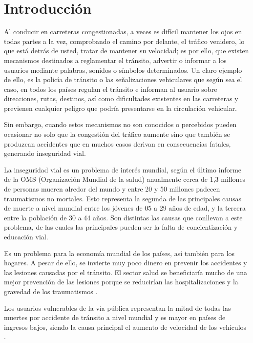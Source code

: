 \chapter{Introducción}
	\setcounter{page}{1}
	\renewcommand{\baselinestretch}{1} %
	Al conducir en carreteras congestionadas, a veces es difícil mantener los ojos en todas partes a la vez, comprobando el camino por delante, el tráfico venidero, lo que está detrás de usted, tratar de mantener su velocidad; es por ello, que existen mecanismos destinados a reglamentar el tránsito, advertir o informar a los usuarios mediante palabras, sonidos o símbolos determinados. Un claro ejemplo de ello, es la policía de tránsito o las señalizaciones vehiculares que según sea el caso, en todos los países regulan el tránsito e informan al usuario sobre direcciones, rutas, destinos, así como dificultades existentes en las carreteras y previenen cualquier peligro que podría presentarse en la circulación vehicular.

	\vskip 0.15cm
	Sin embargo, cuando estos mecanismos no son conocidos o percebidos pueden ocasionar no solo que la congestión del tráfico aumente sino que también se produzcan accidentes que en muchos casos derivan en consecuencias fatales, generando inseguridad vial.

	\vskip 0.15cm
	La inseguridad vial es un problema de interés mundial, según el último informe de la OMS (Organización Mundial de la salud) anualmente cerca de 1,3 millones de personas mueren alredor del mundo y entre 20 y 50 millones padecen traumatismos no mortales\citep{OMS}. Esto representa la segunda de las principales causas de muerte a nivel mundial entre los jóvenes de 05 a 29 años de edad, y la tercera entre la población de 30 a 44 años. Son distintas las causas que conllevan a este problema, de las cuales las principales pueden ser la falta de concientización y educación vial. 
	
	\vskip 0.15cm	
	Es un problema para la economía mundial de los países, así también para los hogares. A pesar de ello, se invierte muy poco dinero en prevenir los accidentes y las lesiones causadas por el tránsito. El sector salud se beneficiaría mucho de una mejor prevención de las lesiones porque se reducirían las hospitalizaciones y la gravedad de los traumatismos \citep{CNSV}.

	\vskip 0.15cm
	Los usuarios vulnerables de la vía pública representan la mitad de todas las muertes por accidente de tránsito a nivel mundial y es mayor en países de ingresos bajos, siendo la causa principal el aumento de velocidad de los vehículos \citep{OMS}.

